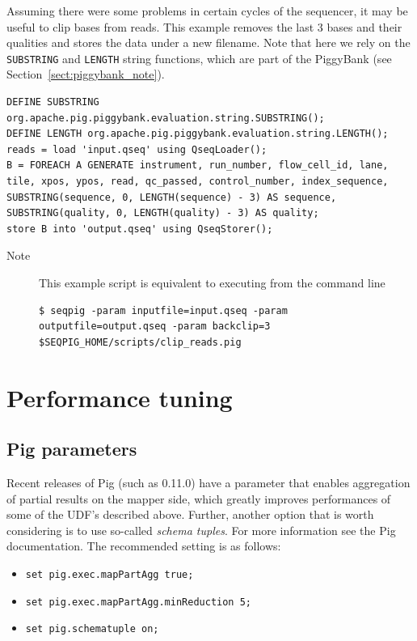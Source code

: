 Assuming there were some problems in certain cycles of the sequencer,
it may be useful to clip bases from reads. This example removes the
last 3 bases and their qualities and stores the data under a new
filename. Note that here we rely on the {\tt SUBSTRING} and {\tt LENGTH}
string functions, which are part of the PiggyBank (see
Section~\ref{sect:piggybank_note}).

\begin{lstlisting}
DEFINE SUBSTRING org.apache.pig.piggybank.evaluation.string.SUBSTRING();
DEFINE LENGTH org.apache.pig.piggybank.evaluation.string.LENGTH();
reads = load 'input.qseq' using QseqLoader();
B = FOREACH A GENERATE instrument, run_number, flow_cell_id, lane, tile, xpos, ypos, read, qc_passed, control_number, index_sequence, SUBSTRING(sequence, 0, LENGTH(sequence) - 3) AS sequence, SUBSTRING(quality, 0, LENGTH(quality) - 3) AS quality;
store B into 'output.qseq' using QseqStorer();
\end{lstlisting}
\begin{description}
	\item[Note] This example script is equivalent to executing from the command line
\begin{lstlisting}
$ seqpig -param inputfile=input.qseq -param outputfile=output.qseq -param backclip=3 $SEQPIG_HOME/scripts/clip_reads.pig
\end{lstlisting}
\end{description}

\section{Performance tuning}

\subsection{Pig parameters}

Recent releases of Pig (such as 0.11.0) have a parameter that enables
aggregation of partial results on the mapper side, which greatly
improves performances of some of the UDF's described above. Further,
another option that is worth considering is to use so-called
\emph{schema tuples}. For more information see the Pig
documentation. The recommended setting is as follows:
\begin{itemize}
\item {\tt set pig.exec.mapPartAgg true;}
\item {\tt set pig.exec.mapPartAgg.minReduction 5;}
\item {\tt set pig.schematuple on;}
\end{itemize}

